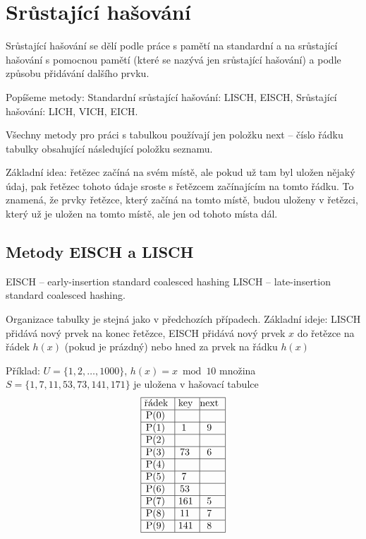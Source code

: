 \documentclass[a4paper,12pt]{article}
\begin{document}
\section{Srůstající hašování}

Srůstající hašování se dělí podle práce s 
pamětí na standardní a na srůstající hašování 
s pomocnou pamětí (které se nazývá jen 
srůstající hašování) a podle způsobu 
přidávání dalšího prvku.

Popíšeme metody:\newline 
\phantom{---}Standardní srůstající hašování: LISCH, EISCH,\newline 
\phantom{---}Srůstající hašování: LICH, VICH, EICH.

Všechny metody pro práci s tabulkou používají jen 
položku next -- číslo řádku tabulky obsahující 
následující položku seznamu. 

Základní idea: řetězec začíná na svém místě, ale 
pokud už tam byl uložen 
nějaký údaj, pak řetězec tohoto údaje sroste s řetězcem 
začínajícím na tomto řádku. To znamená, že prvky řetězce, který začíná na tomto místě, budou uloženy v řetězci, který už je uložen na tomto místě, ale jen od tohoto místa dál.

\subsection{
Metody EISCH a LISCH
}

\phantom{---}EISCH -- early-insertion standard coalesced hashing\newline 
\phantom{---}LISCH -- late-insertion standard coalesced hashing.
 

Organizace tabulky je stejná jako v předchozích 
případech.\newline 
Základní ideje: LISCH přidává nový prvek na konec 
řetězce, \newline 
EISCH přidává nový prvek $x$ do řetězce na 
řádek $h(x)$ (pokud je prázdný) nebo hned za prvek na řádku $h(x)$\newline 

Příklad: $U=\{1,2,\dots,1000\}$, $h(x)=x\bmod10$\newline 
množina $S=\{1,7,11,53,73,141,171\}$ je uložena 
v hašovací tabulce
$$\vtop{\offinterlineskip\halign {\strut\vrule\ # & \vrule\ # & \vrule \hfil # \hfil \vrule\cr\noalign{\hrule}řádek & key & next \hfil \cr\noalign{\hrule}P(0) & &\hfill \cr\noalign{\hrule}P(1) & 1 & 9 \cr\noalign{\hrule}P(2) & &\hfill \cr\noalign{\hrule}P(3) & 73 & 6 \cr\noalign{\hrule}P(4) &  &\hfill \cr\noalign{\hrule}P(5) & 7 & \hfill \cr\noalign{\hrule}P(6) & 53 &\hfill \cr\noalign{\hrule}P(7) & 161 & 5 \cr\noalign{\hrule}P(8) & 11 & 7  \cr\noalign{\hrule}P(9) & 141 & 8 \cr\noalign{\hrule}}}$$
\end{document}
